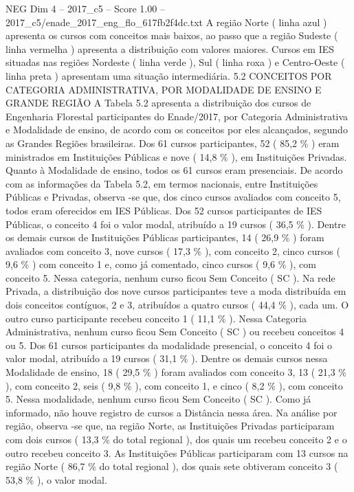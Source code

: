 \begin{textsample}{NEG Dim 4 – 2017\_c5 – Score 1.00 – 2017\_c5/enade\_2017\_eng\_flo\_617fb2f4dc.txt}
A região Norte ( linha azul ) apresenta os cursos com conceitos mais baixos, ao passo que a região Sudeste ( linha vermelha ) apresenta a distribuição com valores maiores.
Cursos em IES situadas nas regiões Nordeste ( linha verde ), Sul ( linha roxa ) e Centro-Oeste ( linha preta ) apresentam uma situação intermediária. 5.2 CONCEITOS POR CATEGORIA ADMINISTRATIVA, POR MODALIDADE DE ENSINO E GRANDE REGIÃO A Tabela 5.2 apresenta a distribuição dos cursos de Engenharia Florestal participantes do Enade/2017, por Categoria Administrativa e Modalidade de ensino, de acordo com os conceitos por eles alcançados, segundo as Grandes Regiões brasileiras.
Dos 61 cursos participantes, 52 ( 85,2 \% ) eram ministrados em Instituições Públicas e nove ( 14,8 \% ), em Instituições Privadas.
Quanto à Modalidade de ensino, todos os 61 cursos eram presenciais.
De acordo com as informações da Tabela 5.2, em termos nacionais, entre Instituições Públicas e Privadas, observa -se que, dos cinco cursos avaliados com conceito 5, todos eram oferecidos em IES Públicas.
Dos 52 cursos participantes de IES Públicas, o conceito 4 foi o valor modal, atribuído a 19 cursos ( 36,5 \% ).
Dentre os demais cursos de Instituições Públicas participantes, 14 ( 26,9 \% ) foram avaliados com conceito 3, nove cursos ( 17,3 \% ), com conceito 2, cinco cursos ( 9,6 \% ) com conceito 1 e, como já comentado, cinco cursos ( 9,6 \% ), com conceito 5.
Nessa categoria, nenhum curso ficou Sem Conceito ( SC ).
Na rede Privada, a distribuição dos nove cursos participantes teve a moda distribuída em dois conceitos contíguos, 2 e 3, atribuídos a quatro cursos ( 44,4 \% ), cada um.
O outro curso participante recebeu conceito 1 ( 11,1 \% ).
Nessa Categoria Administrativa, nenhum curso ficou Sem Conceito ( SC ) ou recebeu conceitos 4 ou 5.
Dos 61 cursos participantes da modalidade presencial, o conceito 4 foi o valor modal, atribuído a 19 cursos ( 31,1 \% ).
Dentre os demais cursos nessa Modalidade de ensino, 18 ( 29,5 \% ) foram avaliados com conceito 3, 13 ( 21,3 \% ), com conceito 2, seis ( 9,8 \% ), com conceito 1, e cinco ( 8,2 \% ), com conceito 5.
Nessa modalidade, nenhum curso ficou Sem Conceito ( SC ).
Como já informado, não houve registro de cursos a Distância nessa área.
Na análise por região, observa -se que, na região Norte, as Instituições Privadas participaram com dois cursos ( 13,3 \% do total regional ), dos quais um recebeu conceito 2 e o outro recebeu conceito 3.
As Instituições Públicas participaram com 13 cursos na região Norte ( 86,7 \% do total regional ), dos quais sete obtiveram conceito 3 ( 53,8 \% ), o valor modal.

\end{textsample}
